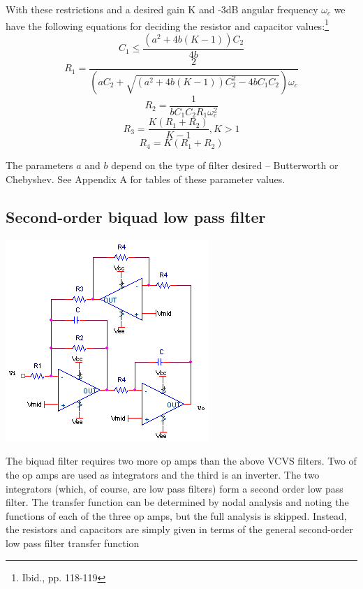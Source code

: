 With these restrictions and a desired gain K and -3dB angular frequency $\omega_{c}$ we have the following equations for deciding the resistor and capacitor values:\footnote{Ibid., pp. 118-119}
\begin{equation}
C_{1} \leq \frac{(a^{2}+4b(K-1))C_{2}}{4b}
\end{equation}
\begin{equation}
R_{1} = \frac{2}{(aC_{2}+\sqrt{(a^{2}+4b(K-1))C_{2}^{2} - 4bC_{1}C_{2}})\omega_{c}}
\end{equation}
\begin{equation}
R_{2} = \frac{1}{bC_{1}C_{2}R_{1}\omega_{c}^{2}}
\end{equation}
\begin{equation}
R_{3} = \frac{K(R_{1}+R_{2})}{K-1}, K > 1
\end{equation}
\begin{equation}
R_{4} = K(R_{1}+R_{2})
\end{equation}

The parameters $a$ and $b$ depend on the type of filter desired -- Butterworth or Chebyshev. See Appendix A for tables of these parameter values.

\subsection{Second-order biquad low pass filter}
\begin{center}
	\includegraphics{schematics/2ndorderbiquadLPfilter.PNG}
\end{center}
The biquad filter requires two more op amps than the above VCVS filters. Two of the op amps are used as integrators and the third is an inverter. The two integrators (which, of course, are low pass filters) form a second order low pass filter. The transfer function can be determined by nodal analysis and noting the functions of each of the three op amps, but the full analysis is skipped. Instead, the resistors and capacitors are simply given in terms of the general second-order low pass filter transfer function

